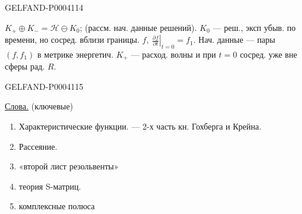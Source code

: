 \begin{GelfandAdjacentEvidence}{GELFAND-P000411}{4}


$K_+\oplus K_-=\mathcal H\ominus K_0$; (рассм. нач. данные решений).
$K_0$ — реш., эксп убыв. по времени, но сосред. вблизи границы.
$f,\ \left.\frac{\partial f}{\partial t}\right|_{t=0}=f_1$.
Нач. данные — пары $(f,f_1)$ в метрике энергетич.
$K_+$ — расход. волны и при $t=0$ сосред. уже вне сферы рад. $R$.
\end{GelfandAdjacentEvidence}
\begin{GelfandAdjacentEvidence}{GELFAND-P000411}{5}


\underline{Слова.} (ключевые)
\begin{enumerate}
\item Характеристические функции. — 2-х часть кн. Гохберга и Крейна.
\item Рассеяние.
\item «второй лист резольвенты»
\item теория S-матриц.
\item комплексные полюса

\end{enumerate}
\end{GelfandAdjacentEvidence}
